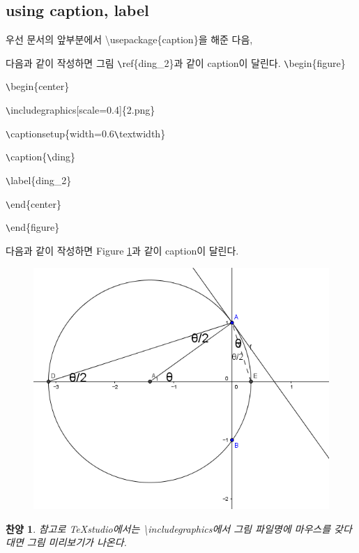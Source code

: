 \documentclass[11pt]{article}
\newtheorem{praise}{찬양}
\begin{document}
\longline

\subsection{using caption, label}
우선 문서의 앞부분에서 \textbackslash usepackage\{caption\}을 해준 다음,

다음과 같이 작성하면 그림 \verb+\+ref\{ding\_2\}과 같이 caption이 달린다.
\verb+\+begin\{figure\}

\verb+\+begin\{center\}

\verb+\+includegraphics[scale=0.4]\{2.png\}

\verb+\+captionsetup\{width=0.6\verb+\+textwidth\}

\verb+\+caption\{\verb+\+ding\}

\verb+\+label\{ding\_2\}

\verb+\+end\{center\}

\verb+\+end\{figure\}

다음과 같이 작성하면 Figure \ref{ding_2}과 같이 caption이 달린다.
\begin{figure}
	\begin{center}
		\includegraphics[scale=0.4]{2.png}
		\captionsetup{width=0.6\textwidth}
		\caption{\ding}
		\label{ding_2}
	\end{center}
\end{figure}

\begin{praise}
	참고로 TeXstudio에서는 \textbackslash includegraphics에서 그림 파일명에 마우스를 갖다대면 그림 미리보기가 나온다.
\end{praise}
\longline
\end{document}
